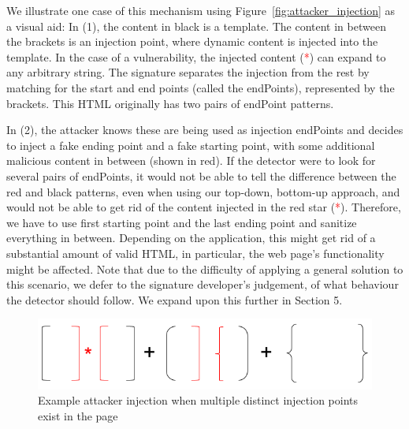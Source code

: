 We illustrate one case of this mechanism using Figure~\ref{fig:attacker_injection} as a visual aid: In (1), the content in black is a template. The content in between the brackets is an injection point, where dynamic content is injected into the template. In the case of a vulnerability, the injected content (\textcolor{red}{*}) can expand to any arbitrary string. The signature separates the injection from the rest by matching for the start and end points (called the endPoints), represented by the brackets. This HTML originally has two pairs of endPoint patterns.

In (2), the attacker knows these are being used as injection endPoints and decides to inject a fake ending point and a fake starting point, with some additional malicious content in between (shown in red). If the detector were to look for several pairs of endPoints, it would not be able to tell the difference between the red and black patterns, even when using our top-down, bottom-up approach, and would not be able to get rid of the content injected in the red star (\textcolor{red}{*}). Therefore, we have to use first starting point and the last ending point and sanitize everything in between. Depending on the application, this might get rid of a substantial amount of valid HTML, in particular, the web page's functionality might be affected. Note that due to the difficulty of applying a general solution to this scenario, we defer to the signature developer's judgement, of what behaviour the detector should follow. We expand upon this further in Section 5.


\begin{figure}[h]
	\includegraphics[scale=0.4]{img/attacker_injection_unique.png}
	\caption{Example attacker injection when multiple distinct injection points exist in the page}
	\label{fig:attacker_injection_unique}
\end{figure}



